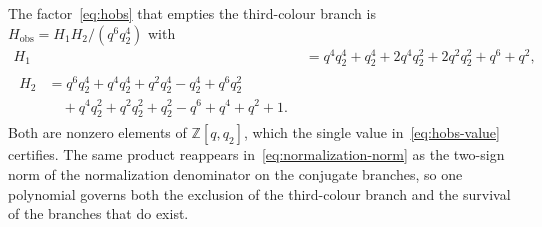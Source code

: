 \documentclass[
  aps,pre,
  reprint,
  superscriptaddress,
  amsmath,amssymb,
  floatfix
]{revtex4-2}
\theoremstyle{plain}
\theoremstyle{definition}
\theoremstyle{remark}
\begin{document}
The factor~\eqref{eq:hobs} that empties the third-colour branch is
$H_{\mathrm{obs}}=H_1H_2/(q^6q_2^4)$ with
\begin{align}
  H_1&=q^4q_2^4+q_2^4+2q^4q_2^2+2q^2q_2^2+q^6+q^2,
  \label{eq:h1}\\
  \begin{split}
  H_2&=q^6q_2^4+q^4q_2^4+q^2q_2^4-q_2^4+q^6q_2^2\\
   &\quad+q^4q_2^2+q^2q_2^2+q_2^2-q^6+q^4+q^2+1 .
  \end{split}
  \label{eq:h2}
\end{align}
Both are nonzero elements of $\mathbb{Z}[q,q_2]$, which the single value
in~\eqref{eq:hobs-value} certifies. The same product reappears
in~\eqref{eq:normalization-norm} as the two-sign norm of the normalization
denominator on the conjugate branches, so one polynomial governs both the
exclusion of the third-colour branch and the survival of the branches that do
exist.



\end{document}
